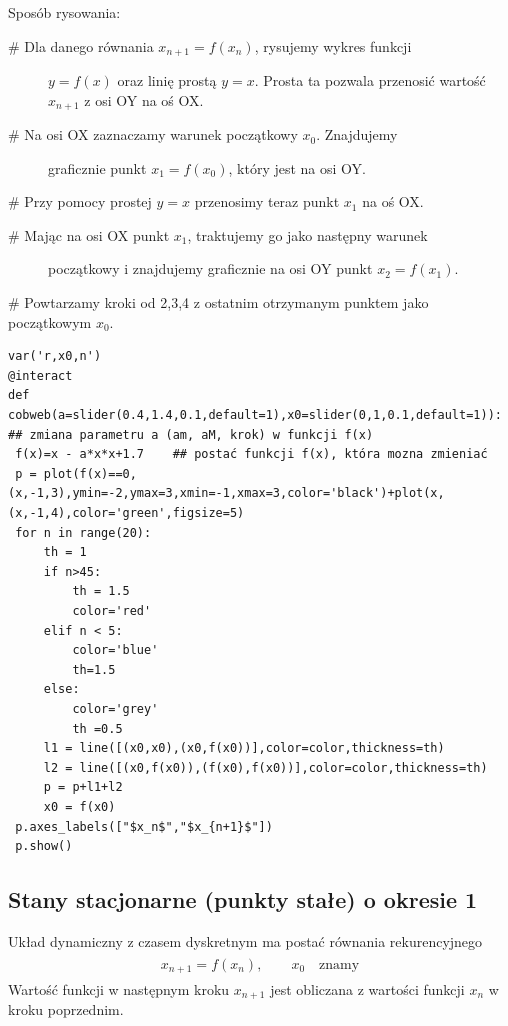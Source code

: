 \documentclass[a4paper,12pt,polish]{sphinxmanual}
\begin{document}
Sposób rysowania:
\begin{description}
\item[{\# Dla danego równania  $x_{n+1} = f(x_n)$, rysujemy wykres funkcji}] \leavevmode
$y = f (x)$ oraz  linię prostą $y  = x$. Prosta ta pozwala
przenosić wartość $x_{n+1}$  z osi OY na oś OX.

\item[{\# Na osi OX zaznaczamy warunek początkowy $x_0$. Znajdujemy}] \leavevmode
graficznie punkt $x_1 = f(x_0)$, który jest na osi OY.

\end{description}

\# Przy pomocy prostej $y=x$ przenosimy teraz  punkt $x_1$ na oś OX.
\begin{description}
\item[{\# Mając na osi OX punkt $x_1$, traktujemy go jako następny warunek}] \leavevmode
początkowy i znajdujemy graficznie na osi OY punkt $x_2=f(x_1)$.

\end{description}

\# Powtarzamy kroki od 2,3,4 z ostatnim otrzymanym punktem jako początkowym $x_0$.


\begin{verbatim}
var('r,x0,n')
@interact
def cobweb(a=slider(0.4,1.4,0.1,default=1),x0=slider(0,1,0.1,default=1)): ## zmiana parametru a (am, aM, krok) w funkcji f(x)
 f(x)=x - a*x*x+1.7    ## postać funkcji f(x), która mozna zmieniać
 p = plot(f(x)==0,(x,-1,3),ymin=-2,ymax=3,xmin=-1,xmax=3,color='black')+plot(x,(x,-1,4),color='green',figsize=5)
 for n in range(20):
     th = 1
     if n>45:
         th = 1.5
         color='red'
     elif n < 5:
         color='blue'
         th=1.5
     else:
         color='grey'
         th =0.5
     l1 = line([(x0,x0),(x0,f(x0))],color=color,thickness=th)
     l2 = line([(x0,f(x0)),(f(x0),f(x0))],color=color,thickness=th)
     p = p+l1+l2
     x0 = f(x0)
 p.axes_labels(["$x_n$","$x_{n+1}$"])
 p.show()
\end{verbatim}



\subsection{Stany stacjonarne (punkty stałe) o okresie 1}
\label{ch1/chI031:stany-stacjonarne-punkty-stale-o-okresie-1}
Układ dynamiczny z czasem dyskretnym ma postać równania rekurencyjnego
\label{ch1/chI031:equation-eqn5}\begin{gather}
\begin{split}x_{n+1} = f(x_n), \quad \quad x_0  \quad \mbox{znamy}\end{split}\label{ch1/chI031-eqn5}
\end{gather}
Wartość funkcji w następnym kroku  $x_{n+1}$  jest obliczana z wartości  funkcji   $x_n$  w kroku poprzednim.
\end{document}
